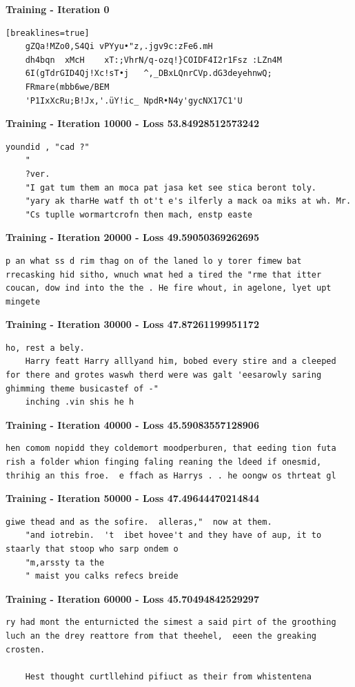 \documentclass{article}
\begin{document}
\noindent \newline \textbf{Training - Iteration 0}
\begin{verbatim}[breaklines=true]
    gZQa!MZo0,S4Qi vPYyu•"z,.jgv9c:zFe6.mH
    dh4bqn	xMcH	xT:;VhrN/q-ozq!}COIDF4I2r1Fsz :LZn4M
    6I(gTdrGID4Qj!Xc!sT•j 	^,_DBxLQnrCVp.dG3deyehnwQ;
    FRmare(mbb6we/BEM
    'P1IxXcRu;B!Jx,'.üY!ic_ NpdR•N4y'gycNX17C1'U
\end{verbatim}
\textbf{Training - Iteration 10000 - Loss 53.84928512573242}
\begin{lstlisting}[breaklines=true]
    youndid , "cad ?"
    "
    ?ver.
    "I gat tum them an moca pat jasa ket see stica beront toly.
    "yary ak tharHe watf th ot't e's ilferly a mack oa miks at wh. Mr.
    "Cs tuplle wormartcrofn then mach, enstp easte
\end{lstlisting}
\textbf{Training - Iteration 20000 - Loss 49.59050369262695}
\begin{lstlisting}[breaklines=true]
    p an what ss d rim thag on of the laned lo y torer fimew bat rrecasking hid sitho, wnuch wnat hed a tired the "rme that itter coucan, dow ind into the the . He fire whout, in agelone, lyet upt mingete
\end{lstlisting}
\textbf{Training - Iteration 30000 - Loss 47.87261199951172}
\begin{lstlisting}[breaklines=true]
    ho, rest a bely.
    Harry featt Harry alllyand him, bobed every stire and a cleeped for there and grotes waswh therd were was galt 'eesarowly saring ghimming theme busicastef of -"
    inching .vin shis he h
\end{lstlisting}
\textbf{Training - Iteration 40000 - Loss 45.59083557128906}
\begin{lstlisting}[breaklines=true]
    hen comom nopidd they coldemort moodperburen, that eeding tion futa rish a folder whion finging faling reaning the ldeed if onesmid, thrihig an this froe.  e ffach as Harrys . . he oongw os thrteat gl
\end{lstlisting}
\textbf{Training - Iteration 50000 - Loss 47.49644470214844}
\begin{lstlisting}[breaklines=true]
    giwe thead and as the sofire.  alleras,"  now at them.
    "and iotrebin.  't  ibet hovee't and they have of aup, it to staarly that stoop who sarp ondem o
    "m,arssty ta the
    " maist you calks refecs breide
\end{lstlisting}
\textbf{Training - Iteration 60000 - Loss 45.70494842529297}
\begin{lstlisting}[breaklines=true]
    ry had mont the enturnicted the simest a said pirt of the groothing luch an the drey reattore from that theehel,  eeen the greaking crosten.

    Hest thought curtllehind pifiuct as their from whistentena
\end{lstlisting}
\end{document}
